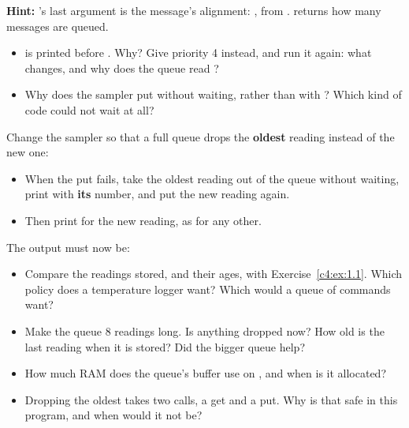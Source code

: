 \noindent \textbf{Hint:} ’s last argument is the message’s alignment:
, from .  returns how
many messages are queued.

\begin{itemize}
  \item {} is printed before . Why? Give  priority 4 instead,
    and run it again: what changes, and why does the queue read ?
  \item Why does the sampler put without waiting, rather than with ? Which kind of code
    could not wait at all?
\end{itemize}

\label{c4:ex:1.2}

Change the sampler so that a full queue drops the \textbf{oldest} reading instead of the new one:

\begin{itemize}
  \item When the put fails, take the oldest reading out of the queue without waiting, print  with \textbf{its} number, and put the new reading again.
  \item Then print  for the new reading, as for any other.
\end{itemize}

The output must now be:


\begin{itemize}
  \item Compare the readings stored, and their ages, with Exercise~\ref{c4:ex:1.1}. Which policy does a
    temperature logger want? Which would a queue of commands want?
  \item Make the queue 8 readings long. Is anything dropped now? How old is the last reading when it is
    stored? Did the bigger queue help?
  \item How much RAM does the queue’s buffer use on , and when is it allocated?
  \item Dropping the oldest takes two calls, a get and a put. Why is that safe in this program, and when
    would it not be?
\end{itemize}

